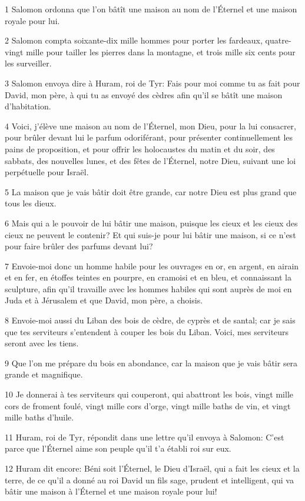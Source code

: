 \par 1 Salomon ordonna que l'on bâtît une maison au nom de l'Éternel et une maison royale pour lui.
\par 2 Salomon compta soixante-dix mille hommes pour porter les fardeaux, quatre-vingt mille pour tailler les pierres dans la montagne, et trois mille six cents pour les surveiller.
\par 3 Salomon envoya dire à Huram, roi de Tyr: Fais pour moi comme tu as fait pour David, mon père, à qui tu as envoyé des cèdres afin qu'il se bâtît une maison d'habitation.
\par 4 Voici, j'élève une maison au nom de l'Éternel, mon Dieu, pour la lui consacrer, pour brûler devant lui le parfum odoriférant, pour présenter continuellement les pains de proposition, et pour offrir les holocaustes du matin et du soir, des sabbats, des nouvelles lunes, et des fêtes de l'Éternel, notre Dieu, suivant une loi perpétuelle pour Israël.
\par 5 La maison que je vais bâtir doit être grande, car notre Dieu est plus grand que tous les dieux.
\par 6 Mais qui a le pouvoir de lui bâtir une maison, puisque les cieux et les cieux des cieux ne peuvent le contenir? Et qui suis-je pour lui bâtir une maison, si ce n'est pour faire brûler des parfums devant lui?
\par 7 Envoie-moi donc un homme habile pour les ouvrages en or, en argent, en airain et en fer, en étoffes teintes en pourpre, en cramoisi et en bleu, et connaissant la sculpture, afin qu'il travaille avec les hommes habiles qui sont auprès de moi en Juda et à Jérusalem et que David, mon père, a choisis.
\par 8 Envoie-moi aussi du Liban des bois de cèdre, de cyprès et de santal; car je sais que tes serviteurs s'entendent à couper les bois du Liban. Voici, mes serviteurs seront avec les tiens.
\par 9 Que l'on me prépare du bois en abondance, car la maison que je vais bâtir sera grande et magnifique.
\par 10 Je donnerai à tes serviteurs qui couperont, qui abattront les bois, vingt mille cors de froment foulé, vingt mille cors d'orge, vingt mille baths de vin, et vingt mille baths d'huile.
\par 11 Huram, roi de Tyr, répondit dans une lettre qu'il envoya à Salomon: C'est parce que l'Éternel aime son peuple qu'il t'a établi roi sur eux.
\par 12 Huram dit encore: Béni soit l'Éternel, le Dieu d'Israël, qui a fait les cieux et la terre, de ce qu'il a donné au roi David un fils sage, prudent et intelligent, qui va bâtir une maison à l'Éternel et une maison royale pour lui!
